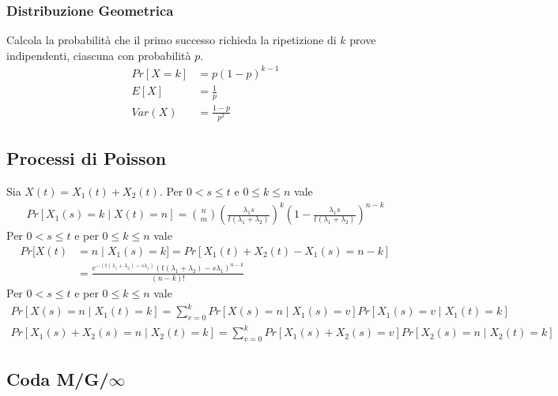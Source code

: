 \documentclass{article}
\begin{document}
\subsubsection{Distribuzione Geometrica}
Calcola la probabilità che il primo successo richieda la ripetizione di $k$ prove indipendenti, ciascuna con probabilità $p$.
\begin{align*}
Pr[X=k] &= p(1-p)^{k-1}\\
E[X] &= \frac{1}{p}\\
Var(X) &= \frac{1-p}{p^2}
\end{align*}


\subsection{Processi di Poisson}

Sia $X(t) = X_1(t) + X_2(t)$. Per $0 < s \le t$ e $0 \le k \le n$ vale
\begin{gather*}
Pr[X_1(s) = k \mid X(t) = n] = \binom{n}{m} \left( \frac{\lambda_1 s}{t(\lambda_1 + \lambda_2)} \right)^k \left(1 - \frac{\lambda_1 s}{t(\lambda_1 + \lambda_2)}\right)^{n-k}
\end{gather*}
Per $0 < s \le t$ e per $0 \le k \le n$ vale
\begin{align*}
Pr[X(t) &= n \mid X_1(s) = k] = Pr[X_1(t) + X_2(t) - X_1(s) = n-k]\\
&= \frac{e^{-(t(\lambda_1 + \lambda_2) - s\lambda_1)} (t(\lambda_1 + \lambda_2) - s\lambda_1)^{n-k}}{(n-k)!}
\end{align*}
Per $0 < s \le t$ e per $0 \le k \le n$ vale
\begin{align*}
Pr[X(s) = n \mid X_1(t) = k] = \sum_{v=0}^k Pr[X(s) = n \mid X_1(s) = v] Pr[X_1(s) = v \mid X_1(t) = k]
\end{align*}
\begin{align*}
Pr[X_1(s) + X_2(s) = n \mid X_2(t) = k] = \sum_{v=0}^k Pr[X_1(s) + X_2(s) = v] Pr[X_2(s) = n \mid X_2(t) = k]
\end{align*}


\subsection{Coda M/G/$\infty$}
\end{document}
